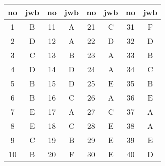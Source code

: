 \documentclass[10pt,a4paper]{article}
\begin{document}
\begin{tabular} {|c|c|c|c|c|c|c|c|}
\hline
no & jwb & no & jwb & no & jwb & no & jwb \\ \hline
1 &B  & 11 &A  & 21 &C  & 31&F \\ \hline
2 &D  & 12 &A  & 22 &D  & 32&D  \\ \hline
3 &C  & 13 &B  & 23 &A  & 33&B \\ \hline
4 &D  & 14 &D  & 24 &A  & 34&C \\ \hline
5 &B  & 15 &D  & 25 &E  & 35&B \\ \hline
6 &B  & 16 &C  & 26 &A  & 36&E \\ \hline
7 &E  & 17 &A  & 27 &C  & 37&A \\ \hline
8 &E  & 18 &C  & 28 &E  & 38&A \\ \hline
9 &C  & 19 &B  & 29 &E  & 39&E \\ \hline
10 &B  & 20 & F & 30 & E & 40&D \\ \hline


\end{tabular}

 
\end{document}
